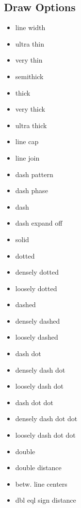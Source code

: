 \subsection*{Draw Options}
{\footnotesize \begin{multicols}{2}\begin{itemize}[leftmargin=1pt,label={}]
    \item line width
    \item ultra thin
    \item very thin
    \item semithick
    \item thick
    \item very thick
    \item ultra thick
    \item line cap
    \item line join
    \item dash pattern
    \item dash phase
    \item dash
    \item dash expand off
    \item solid 
    \item dotted
    \item densely dotted
    \item loosely dotted
    \item dashed
    \item densely dashed
    \item loosely dashed
    \item dash dot
    \item densely dash dot
    \item loosely dash dot
    \item dash dot dot
    \item densely dash dot dot
    \item loosely dash dot dot
    \item double
    \item double distance
    \item \textquotesingle\textquotesingle\textquotesingle  betw. line centers
    \item dbl eql sign distance
\end{itemize}\end{multicols}}


